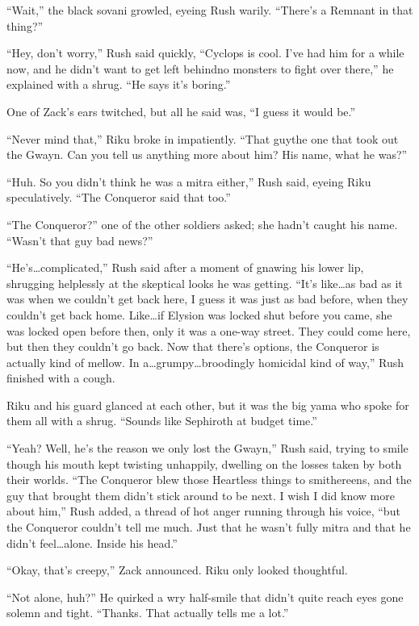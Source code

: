 ``Wait,'' the black sovani growled, eyeing Rush warily. ``There's a Remnant in that thing?''

``Hey, don't worry,'' Rush said quickly, ``Cyclops is cool. I've had him for a while now, and he didn't want to get left behind\textemdash no monsters to fight over there,'' he explained with a shrug. ``He says it's boring.''

One of Zack's ears twitched, but all he said was, ``I guess it would be.''

``Never mind that,'' Riku broke in impatiently. ``That guy\textemdash the one that took out the Gwayn. Can you tell us anything more about him? His name, what he was?''

``Huh. So you didn't think he was a mitra either,'' Rush said, eyeing Riku speculatively. ``The Conqueror said that too.''

``The Conqueror?'' one of the other soldiers asked; she hadn't caught his name. ``Wasn't that guy bad news?''

``He's\ldots complicated,'' Rush said after a moment of gnawing his lower lip, shrugging helplessly at the skeptical looks he was getting. ``It's like\ldots as bad as it was when we couldn't get back here, I guess it was just as bad before, when they couldn't get back home. Like\ldots if Elysion was locked shut before you came, she was locked open before then, only it was a one-way street. They could come here, but then they couldn't go back. Now that there's options, the Conqueror is actually kind of mellow. In a\ldots grumpy\ldots broodingly homicidal kind of way,'' Rush finished with a cough.

Riku and his guard glanced at each other, but it was the big yama who spoke for them all with a shrug. ``Sounds like Sephiroth at budget time.''

``Yeah? Well, he's the reason we only lost the Gwayn,'' Rush said, trying to smile though his mouth kept twisting unhappily, dwelling on the losses taken by both their worlds. ``The Conqueror blew those Heartless things to smithereens, and the guy that brought them didn't stick around to be next. I wish I did know more about him,'' Rush added, a thread of hot anger running through his voice, ``but the Conqueror couldn't tell me much. Just that he wasn't fully mitra and that he didn't feel\ldots alone. Inside his head.''

``Okay, that's creepy,'' Zack announced. Riku only looked thoughtful.

``Not alone, huh?'' He quirked a wry half-smile that didn't quite reach eyes gone solemn and tight. ``Thanks. That actually tells me a lot.''

